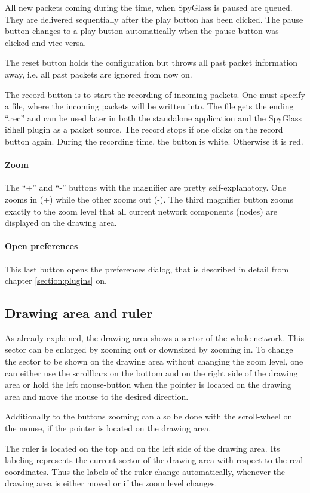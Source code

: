 All new packets coming during the time, when SpyGlass is paused are queued. They are delivered sequentially after the
play button has been clicked. The pause button changes to a play button automatically when the pause button was clicked
and vice versa.

The reset button holds the configuration but throws all past packet information away, i.e. all past packets are ignored from
now on.

The record button is to start the recording of incoming packets. One must specify a file, where the incoming packets will be
written into. The file gets the ending ``.rec'' and can be used later in both the standalone application and the
SpyGlass iShell plugin as a packet source. The record stops if one clicks on the record button again. During the recording
time, the button is white. Otherwise it is red.

\paragraph{Zoom}

The ``+'' and ``-'' buttons with the magnifier are pretty self-explanatory. One zooms in (+) while the other zooms out (-).
The third magnifier button zooms exactly to the zoom level that all current network components (nodes) are displayed on the
drawing area.

\paragraph{Open preferences}

This last button opens the preferences dialog, that is described in detail from chapter \ref{section:plugins} on.


\subsection{Drawing area and ruler}

As already explained, the drawing area shows a sector of the whole network. This sector can be enlarged by zooming out
or downsized by zooming in. To change the sector to be shown on the drawing area without changing the zoom level,
one can either use the scrollbars
on the bottom and on the right side of the drawing area or hold the left mouse-button when the pointer is located on the
drawing area and move the mouse to the desired direction.

Additionally to the buttons zooming can also be done with the scroll-wheel on the mouse, if the pointer is located
on the drawing area.

The ruler is located on the top and on the left side of the drawing area. Its labeling represents the current sector
of the drawing area with respect to the real coordinates. Thus the labels of the ruler change automatically,
whenever the drawing area is either moved or if the zoom level changes.